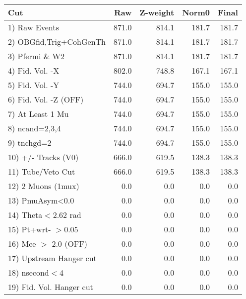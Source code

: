  \begin{table}[h!]\centering
 \begin{tabular}{||l||r|r|r|r||}
 \hline
 \hline
 Cut & Raw & Z-weight & Norm0 & Final \\
 \hline
  1) Raw Events           &       871.0 &       814.1 &       181.7 &       181.7 \\
  2) OBGfid,Trig+CohGenTh &       871.0 &       814.1 &       181.7 &       181.7 \\
  3) Pfermi \& W2         &       871.0 &       814.1 &       181.7 &       181.7 \\
  4) Fid. Vol. -X         &       802.0 &       748.8 &       167.1 &       167.1 \\
  5) Fid. Vol. -Y         &       744.0 &       694.7 &       155.0 &       155.0 \\
  6) Fid. Vol. -Z (OFF)   &       744.0 &       694.7 &       155.0 &       155.0 \\
  7) At Least 1 Mu        &       744.0 &       694.7 &       155.0 &       155.0 \\
  8) ncand=2,3,4          &       744.0 &       694.7 &       155.0 &       155.0 \\
  9) tnchgd=2             &       744.0 &       694.7 &       155.0 &       155.0 \\
 10) +/- Tracks (V0)      &       666.0 &       619.5 &       138.3 &       138.3 \\
 11) Tube/Veto Cut        &       666.0 &       619.5 &       138.3 &       138.3 \\
 12) 2 Muons (1mux)       &         0.0 &         0.0 &         0.0 &         0.0 \\
 13) PmuAsym<0.0          &         0.0 &         0.0 &         0.0 &         0.0 \\
 14) Theta$<$2.62 rad     &         0.0 &         0.0 &         0.0 &         0.0 \\
 15) Pt+wrt- $>$0.05      &         0.0 &         0.0 &         0.0 &         0.0 \\
 16) Mee $>$ 2.0  (OFF)   &         0.0 &         0.0 &         0.0 &         0.0 \\
 17) Upstream Hanger cut  &         0.0 &         0.0 &         0.0 &         0.0 \\
 18) nsecond$<$4          &         0.0 &         0.0 &         0.0 &         0.0 \\
 19) Fid. Vol. Hanger cut &         0.0 &         0.0 &         0.0 &         0.0 \\

\end{tabular}
\end{table}
